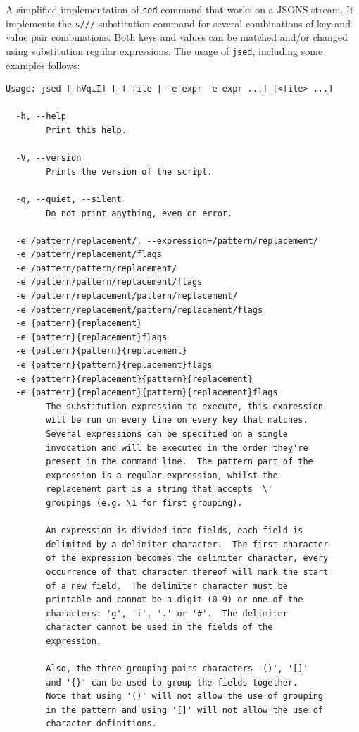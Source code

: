\documentclass[11pt,a4paper,twoside,openright]{report}
\begin{document}
A simplified implementation of \texttt{sed} command that works on a JSONS
stream.  It implements the \texttt{s///} substitution command for several
combinations of key and value pair combinations.  Both keys and values can be
matched and/or changed using substitution regular expressions.  The usage of
\texttt{jsed}, including some examples follows:

{\small
\begin{verbatim}
Usage: jsed [-hVqiI] [-f file | -e expr -e expr ...] [<file> ...]

  -h, --help
        Print this help.

  -V, --version
        Prints the version of the script.

  -q, --quiet, --silent
        Do not print anything, even on error.

  -e /pattern/replacement/, --expression=/pattern/replacement/
  -e /pattern/replacement/flags
  -e /pattern/pattern/replacement/
  -e /pattern/pattern/replacement/flags
  -e /pattern/replacement/pattern/replacement/
  -e /pattern/replacement/pattern/replacement/flags
  -e {pattern}{replacement}
  -e {pattern}{replacement}flags
  -e {pattern}{pattern}{replacement}
  -e {pattern}{pattern}{replacement}flags
  -e {pattern}{replacement}{pattern}{replacement}
  -e {pattern}{replacement}{pattern}{replacement}flags
        The substitution expression to execute, this expression
        will be run on every line on every key that matches.
        Several expressions can be specified on a single
        invocation and will be executed in the order they're
        present in the command line.  The pattern part of the
        expression is a regular expression, whilst the
        replacement part is a string that accepts '\'
        groupings (e.g. \1 for first grouping).

        An expression is divided into fields, each field is
        delimited by a delimiter character.  The first character
        of the expression becomes the delimiter character, every
        occurrence of that character thereof will mark the start
        of a new field.  The delimiter character must be
        printable and cannot be a digit (0-9) or one of the
        characters: 'g', 'i', '.' or '#'.  The delimiter
        character cannot be used in the fields of the
        expression.

        Also, the three grouping pairs characters '()', '[]'
        and '{}' can be used to group the fields together.
        Note that using '()' will not allow the use of grouping
        in the pattern and using '[]' will not allow the use of
        character definitions.


\end{verbatim}}
\end{document}
